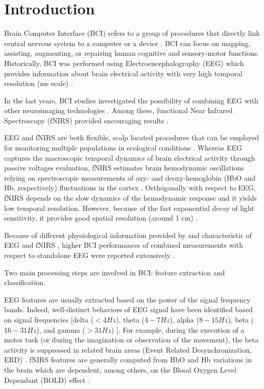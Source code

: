 \documentclass[12pt ]{iopart}
\begin{document}
\section{Introduction}

Brain Computer Interface (BCI) refers to a group of procedures that directly link  central nervous system to a computer or a device \parencite{wolpaw2000brain}. BCI can focus on mapping, assisting, augmenting, or repairing human cognitive and sensory-motor functions. 
Historically, BCI was performed using Electroencephalography (EEG) \parencite{lotte2007review} which  provides information about brain electrical activity with very high temporal resolution (ms scale) \parencite{hallez2007review}. 

In the last years, BCI studies investigated the possibility of combining EEG with other neuroimaging technologies \parencite{pfurtscheller2010hybrid}. Among these, functional Near Infrared Spectroscopy (fNIRS) provided encouraging results \parencite{fazli2012enhanced}. 

EEG and fNIRS are both flexible, scalp located procedures that can be employed for monitoring multiple populations in ecological conditions \parencite{farroni2013infant, costantini2013studying, zappasodi2017prognostic, watanabe1999neonatal}. Whereas EEG captures the macroscopic temporal dynamics of brain electrical activity through passive voltages evaluation, fNIRS estimates brain hemodynamic oscillations  relying on spectroscopic measurements of oxy- and deoxy-hemoglobin (HbO and Hb, respectively) fluctuations in the cortex \parencite{villringer1997non, ferrari2012brief}. Orthogonally with respect to EEG, fNIRS depends on the slow dynamics of the hemodynamic response and it yields low temporal resolution. However, because of the fast exponential decay of light sensitivity, it provides good spatial resolution (around 1 cm) \parencite{chiarelli2016combining, chiarelli2015comparison}. 

Because of different physiological information provided by and characteristic of EEG and fNIRS \parencite{croce2017exploiting}, higher BCI performances  of combined measurements with respect to standalone EEG were reported extensively \parencite{fazli2012enhanced, khan2014decoding, hong2015classification, chiarelliREVdaaggiungere} .

Two main processing steps are involved in BCI:  feature extraction and classification. 

EEG features are usually extracted based on the power of the signal frequency bands. Indeed, well-distinct behaviors of EEG signal have been identified based on signal frequencies [delta ($< 4 Hz$), theta ($4-7 Hz$), alpha ($8-15 Hz$), beta ($16-31 Hz$), and gamma ($> 31 Hz$) \parencite{nuwer1988quantitative}]. For example, during the execution of a motor task (or during the imagination or observation of the movement), the beta activity is suppressed in related brain areas (Event Related Desynchronization, ERD) \parencite{pfurtscheller2001functional, pfurtscheller2006future}.  
fNIRS  features are generally  computed from  HbO and Hb variations in the brain which are dependent, among others, on the  Blood Oxygen Level Dependant (BOLD) effect \parencite{steinbrink2006illuminating, naseer2015fnirs}. 
\end{document}
